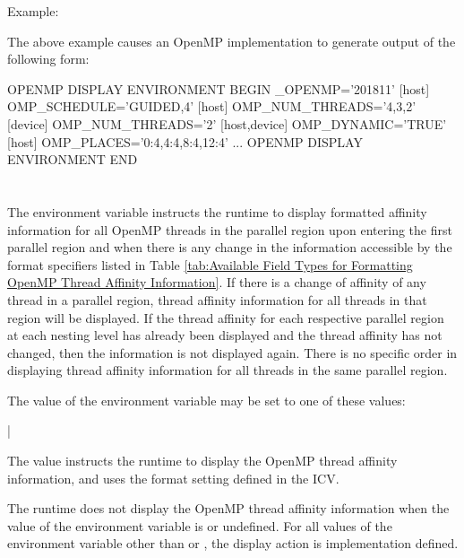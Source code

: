 Example:
\begin{ompEnv}
\end{ompEnv}

The above example causes an OpenMP implementation to generate output of the
following form:

\begin{ompEnv}
OPENMP DISPLAY ENVIRONMENT BEGIN
  _OPENMP='201811'
  [host] OMP_SCHEDULE='GUIDED,4'
  [host] OMP_NUM_THREADS='4,3,2'
  [device] OMP_NUM_THREADS='2'
  [host,device] OMP_DYNAMIC='TRUE'
  [host] OMP_PLACES='{0:4},{4:4},{8:4},{12:4}'
  ...
OPENMP DISPLAY ENVIRONMENT END
\end{ompEnv}


\section{}
\label{sec:OMP_DISPLAY_AFFINITY}
The  environment variable instructs the runtime to
display formatted affinity information for all OpenMP threads in the parallel
region upon entering the first parallel region and when there is any change in
the information accessible by the format specifiers listed in Table
\ref{tab:Available Field Types for Formatting OpenMP Thread Affinity Information}.
If there is a change of affinity of any thread in a parallel region, thread
affinity information for all threads in that region will be displayed.
If the thread affinity for each respective parallel region at each nesting level
has already been displayed and the thread affinity has not changed, then the
information is not displayed again.
There is no specific order in displaying thread affinity information for all
threads in the same parallel region.

The value of the  environment variable may be set to one of these
values:

{|}


The  value instructs the runtime to display the OpenMP thread affinity information, and uses the
format setting defined in the  ICV.

The runtime does not display the OpenMP thread affinity information when the value of the 
environment variable is  or undefined. For all values of the environment
variable other than  or , the display action is implementation defined.


